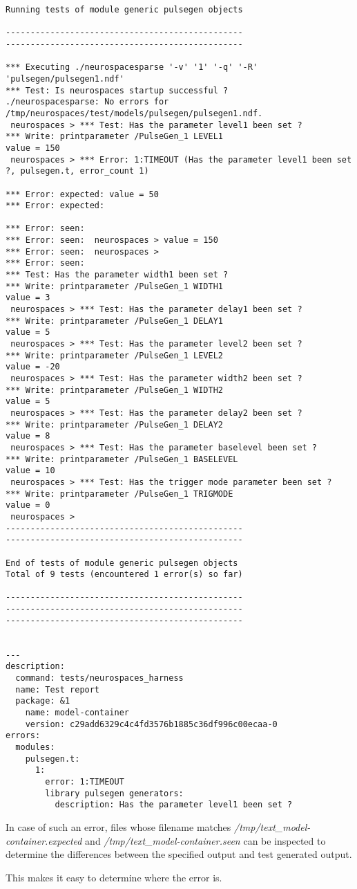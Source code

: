 \documentclass[12pt]{article}
\begin{document}
\begin{verbatim}
Running tests of module generic pulsegen objects

------------------------------------------------
------------------------------------------------

*** Executing ./neurospacesparse '-v' '1' '-q' '-R' 'pulsegen/pulsegen1.ndf'
*** Test: Is neurospaces startup successful ?
./neurospacesparse: No errors for /tmp/neurospaces/test/models/pulsegen/pulsegen1.ndf.
 neurospaces > *** Test: Has the parameter level1 been set ?
*** Write: printparameter /PulseGen_1 LEVEL1
value = 150
 neurospaces > *** Error: 1:TIMEOUT (Has the parameter level1 been set ?, pulsegen.t, error_count 1)

*** Error: expected: value = 50
*** Error: expected: 

*** Error: seen: 
*** Error: seen:  neurospaces > value = 150
*** Error: seen:  neurospaces > 
*** Error: seen: 
*** Test: Has the parameter width1 been set ?
*** Write: printparameter /PulseGen_1 WIDTH1
value = 3
 neurospaces > *** Test: Has the parameter delay1 been set ?
*** Write: printparameter /PulseGen_1 DELAY1
value = 5
 neurospaces > *** Test: Has the parameter level2 been set ?
*** Write: printparameter /PulseGen_1 LEVEL2
value = -20
 neurospaces > *** Test: Has the parameter width2 been set ?
*** Write: printparameter /PulseGen_1 WIDTH2
value = 5
 neurospaces > *** Test: Has the parameter delay2 been set ?
*** Write: printparameter /PulseGen_1 DELAY2
value = 8
 neurospaces > *** Test: Has the parameter baselevel been set ?
*** Write: printparameter /PulseGen_1 BASELEVEL
value = 10
 neurospaces > *** Test: Has the trigger mode parameter been set ?
*** Write: printparameter /PulseGen_1 TRIGMODE
value = 0
 neurospaces > 
------------------------------------------------
------------------------------------------------

End of tests of module generic pulsegen objects
Total of 9 tests (encountered 1 error(s) so far)

------------------------------------------------
------------------------------------------------
------------------------------------------------


---
description:
  command: tests/neurospaces_harness
  name: Test report
  package: &1
    name: model-container
    version: c29add6329c4c4fd3576b1885c36df996c00ecaa-0
errors:
  modules:
    pulsegen.t:
      1:
        error: 1:TIMEOUT
        library pulsegen generators:
          description: Has the parameter level1 been set ?
\end{verbatim}
In case of such an error, files whose filename matches {\it /tmp/text\_model-container.expected} and  {\it /tmp/text\_model-container.seen} can be inspected to determine the differences between the specified output and test generated output.

This makes it easy to determine where the error is. 
\end{document}
